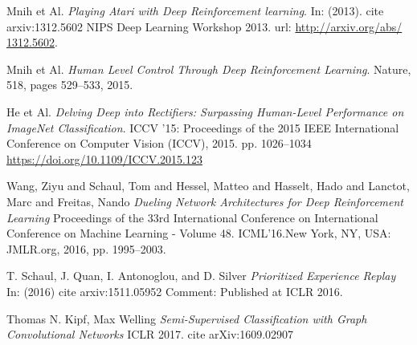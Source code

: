 \documentclass[a4paper,14pt]{extreport}
\begin{document}
\begin{thebibliography}{9}

	
	Mnih et Al.
	\textit{Playing Atari with Deep Reinforcement learning}. 
	In: (2013). cite arxiv:1312.5602 
	NIPS Deep Learning Workshop 2013. url: \url{http://arxiv.org/abs/
	1312.5602}.
	
	Mnih et Al.
	\textit{Human Level Control Through Deep Reinforcement Learning}. 
	Nature, 518, pages 529–533, 2015.

	He et Al.
	\textit{Delving Deep into Rectifiers: Surpassing Human-Level Performance on ImageNet Classification}. 
	 ICCV '15: Proceedings of the 2015 IEEE International Conference on Computer Vision (ICCV), 2015.
	 pp. 1026–1034 \url{https://doi.org/10.1109/ICCV.2015.123}
	 
	 Wang, Ziyu and Schaul, Tom and Hessel, Matteo and Hasselt, Hado and Lanctot, Marc and Freitas, Nando
	 \textit{Dueling Network Architectures for Deep Reinforcement Learning}
	 Proceedings of the 33rd International Conference on International Conference on Machine Learning - Volume 48.
	 ICML’16.New York, NY, USA: JMLR.org, 2016, pp. 1995–2003.
	 
	 T. Schaul, J. Quan, I. Antonoglou, and D. Silver
	 \textit{Prioritized Experience Replay}
	 In: (2016) cite arxiv:1511.05952
	 Comment: Published at ICLR 2016.
	 
	 Thomas N. Kipf, Max Welling
	 \textit{Semi-Supervised Classification with Graph Convolutional Networks}
	 ICLR 2017. cite arXiv:1609.02907

\end{thebibliography}
\end{document}
